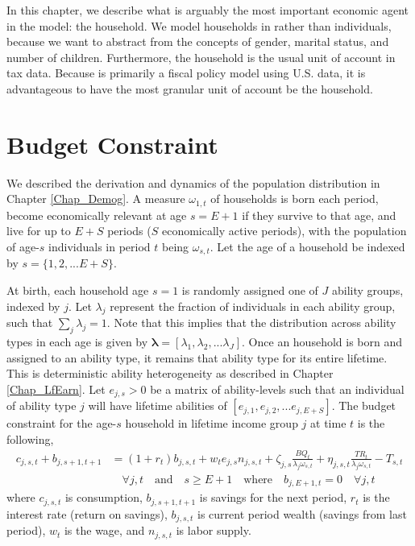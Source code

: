 
In this chapter, we describe what is arguably the most important economic agent in the \ogindia model: the household. We model households in \ogindia rather than individuals, because we want to abstract from the concepts of gender, marital status, and number of children. Furthermore, the household is the usual unit of account in tax data. Because \ogindia is primarily a fiscal policy model using U.S. data, it is advantageous to have the most granular unit of account be the household.


\section{Budget Constraint}\label{SecHHBC}

  We described the derivation and dynamics of the population distribution in Chapter \ref{Chap_Demog}. A measure $\omega_{1,t}$ of households is born each period, become economically relevant at age $s=E+1$ if they survive to that age, and live for up to $E+S$ periods ($S$ economically active periods), with the population of age-$s$ individuals in period $t$ being $\omega_{s,t}$. Let the age of a household be indexed by $s = \{1,2,...E+S\}$.

  At birth, each household age $s=1$ is randomly assigned one of $J$ ability groups, indexed by $j$. Let $\lambda_j$ represent the fraction of individuals in each ability group, such that $\sum_j\lambda_j=1$. Note that this implies that the distribution across ability types in each age is given by $\bm{\lambda}=[\lambda_1,\lambda_2,...\lambda_J]$. Once an household is born and assigned to an ability type, it remains that ability type for its entire lifetime. This is deterministic ability heterogeneity as described in Chapter \ref{Chap_LfEarn}. Let $e_{j,s}>0$ be a matrix of ability-levels such that an individual of ability type $j$ will have lifetime abilities of $[e_{j,1},e_{j,2},...e_{j,E+S}]$. The budget constraint for the age-$s$ household in lifetime income group $j$ at time $t$ is the following,
  \begin{equation}\label{EqHHBC}
    \begin{split}
      c_{j,s,t} + b_{j,s+1,t+1} &= (1 + r_{t})b_{j,s,t} + w_t e_{j,s} n_{j,s,t} + \zeta_{j,s}\frac{BQ_t}{\lambda_j\omega_{s,t}} + \eta_{j,s,t}\frac{TR_{t}}{\lambda_j\omega_{s,t}} - T_{s,t}  \\
      &\quad\forall j,t\quad\text{and}\quad s\geq E+1 \quad\text{where}\quad b_{j,E+1,t}=0\quad\forall j,t
    \end{split}
  \end{equation}
  where $c_{j,s,t}$ is consumption, $b_{j,s+1,t+1}$ is savings for the next period, $r_t$ is the interest rate (return on savings), $b_{j,s,t}$ is current period wealth (savings from last period), $w_t$ is the wage, and $n_{j,s,t}$ is labor supply.

